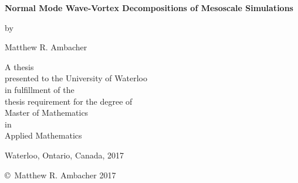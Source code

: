 \pagestyle{empty}

\begin{titlepage}
        \begin{center}
        \vspace*{1.0cm}

        \Huge
        {\bf Normal Mode Wave-Vortex Decompositions of Mesoscale Simulations}

        \vspace*{1.0cm}

        \normalsize
        by \\

        \vspace*{1.0cm}

        \Large
        Matthew R. Ambacher \\

        \vspace*{3.0cm}

        \normalsize
        A thesis \\
        presented to the University of Waterloo \\ 
        in fulfillment of the \\
        thesis requirement for the degree of \\
        Master of Mathematics \\
        in \\
        Applied Mathematics \\

        \vspace*{2.0cm}

        Waterloo, Ontario, Canada, 2017 \\

        \vspace*{1.0cm}

        \copyright\ Matthew R. Ambacher 2017 \\
        \end{center}
\end{titlepage}

\pagestyle{plain}
\setcounter{page}{2}

